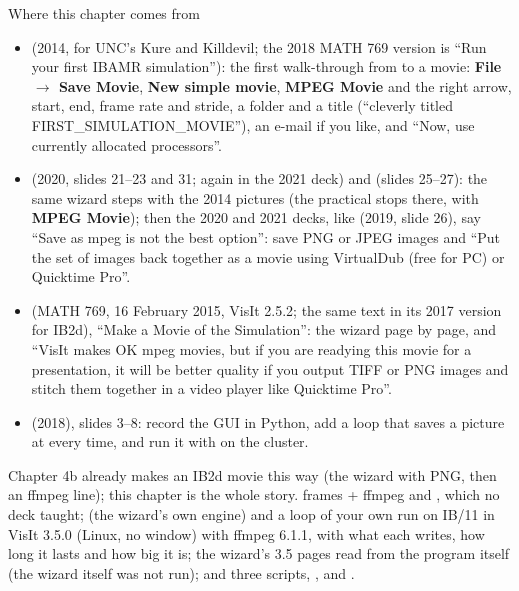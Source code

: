 \documentclass[aspectratio=169,11pt]{beamer}
\newcommand{\gui}[1]{\textsf{\textbf{#1}}}
\begin{document}
\begin{frame}{Where this chapter comes from}
\label{fr:sources}
\scriptsize
\begin{itemize}
  \item {} (2014, for UNC's Kure and Killdevil; the 2018 MATH 769 version is ``Run your first IBAMR simulation''): the first walk-through from  to a movie: \gui{File $\to$ Save Movie}, \gui{New simple movie}, \gui{MPEG Movie} and the right arrow, start, end, frame rate and stride, a folder and a title (``cleverly titled FIRST\_SIMULATION\_MOVIE''), an e-mail if you like, and ``Now, use currently allocated processors''.
  \item {} (2020, slides 21--23 and 31; again in the 2021 deck) and  (slides 25--27): the same wizard steps with the 2014 pictures (the practical stops there, with \gui{MPEG Movie}); then the 2020 and 2021 decks, like  (2019, slide 26), say ``Save as mpeg is not the best option'': save PNG or JPEG images and ``Put the set of images back together as a movie using VirtualDub (free for PC) or Quicktime Pro''.
  \item {} (MATH 769, 16 February 2015, VisIt 2.5.2; the same text in its 2017 version for IB2d), ``Make a Movie of the Simulation'': the wizard page by page, and ``VisIt makes OK mpeg movies, but if you are readying this movie for a presentation, it will be better quality if you output TIFF or PNG images and stitch them together in a video player like Quicktime Pro''.
  \item {} (2018), slides 3--8: record the GUI in Python, add a loop that saves a picture at every time, and run it with  on the cluster.
\end{itemize}
Chapter 4b already makes an IB2d movie this way (the wizard with PNG, then an ffmpeg line); this chapter is the whole story.  frames + ffmpeg and , which no deck taught;  (the wizard's own engine) and a loop of your own run on IB/11 in VisIt 3.5.0 (Linux, no window) with ffmpeg 6.1.1, with what each writes, how long it lasts and how big it is; the wizard's 3.5 pages read from the program itself (the wizard itself was not run); and three scripts, ,  and .
\end{frame}
\end{document}
